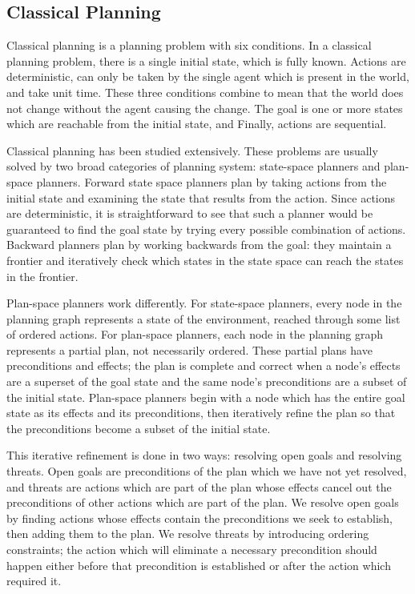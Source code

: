 \subsection{Classical Planning}
Classical planning is a planning problem with six conditions.  In a classical planning problem,
there is a single initial state, which is fully known.  Actions are deterministic, can only
be taken by the single agent which is present in the world, and take unit time.  These three
conditions combine to mean that the world does not change without the agent causing the change.
The goal is one or more states which are reachable from the initial state, and
Finally, actions are sequential.

Classical planning has been studied extensively.  These problems are usually solved by two broad categories of
planning system: state-space planners and plan-space planners.  Forward state space planners
plan by taking actions from the initial state and examining the state that results from the action.  Since
actions are deterministic, it is straightforward to see that such a planner would be guaranteed to find
the goal state by trying every possible combination of actions.  Backward planners plan by working
backwards from the goal: they maintain a frontier and iteratively check which states in the state space
can reach the states in the frontier.

Plan-space planners work differently.  For state-space planners, every node in the planning graph
represents a state of the environment, reached through some list of ordered actions.  For plan-space
planners, each node in the planning graph represents a partial plan, not necessarily ordered.  These partial plans
have preconditions and effects; the plan is complete and correct when a node's effects are a superset
of the goal state and the same node's preconditions are a subset of the initial state.  Plan-space
planners begin with a node which has the entire goal state as its effects and its preconditions, then
iteratively refine the plan so that the preconditions become a subset of the initial state.

This iterative refinement is done in two ways: resolving open goals and resolving threats.
Open goals are preconditions of the plan which we have not yet resolved, and threats are
actions which are part of the plan whose effects cancel out the
preconditions of other actions which are part of the plan.  We resolve open goals by finding
actions whose effects contain the preconditions we seek to establish, then adding them to
the plan.  We resolve threats by introducing ordering constraints; the action which will
eliminate a necessary precondition should happen either before that precondition is established
or after the action which required it.


